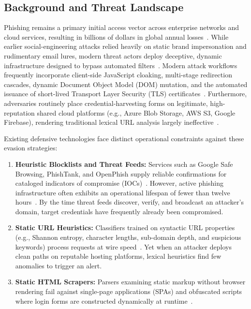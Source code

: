 \documentclass[conference]{IEEEtran}
\begin{document}
\subsection{Background and Threat Landscape}\label{background}

Phishing remains a primary initial access vector across enterprise networks and cloud services, resulting in billions of dollars in global annual losses~\cite{basit2021,zienie2023}. While earlier social-engineering attacks relied heavily on static brand impersonation and rudimentary email lures, modern threat actors deploy deceptive, dynamic infrastructure designed to bypass automated filters~\cite{tang2021}. Modern attack workflows frequently incorporate client-side JavaScript cloaking, multi-stage redirection cascades, dynamic Document Object Model (DOM) mutation, and the automated issuance of short-lived Transport Layer Security (TLS) certificates~\cite{sanchez2022,castano2023}. Furthermore, adversaries routinely place credential-harvesting forms on legitimate, high-reputation shared cloud platforms (e.g., Azure Blob Storage, AWS S3, Google Firebase), rendering traditional lexical URL analysis largely ineffective~\cite{kara2022,reyes2024}.

Existing defensive technologies face distinct operational constraints against these evasion strategies:
\begin{enumerate}[leftmargin=2.5em]
    \item \textbf{Heuristic Blocklists and Threat Feeds:} Services such as Google Safe Browsing, PhishTank, and OpenPhish supply reliable confirmations for cataloged indicators of compromise (IOCs)~\cite{purwanto2022}. However, active phishing infrastructure often exhibits an operational lifespan of fewer than twelve hours~\cite{castano2023}. By the time threat feeds discover, verify, and broadcast an attacker's domain, target credentials have frequently already been compromised.
    \item \textbf{Static URL Heuristics:} Classifiers trained on syntactic URL properties (e.g., Shannon entropy, character lengths, sub-domain depth, and suspicious keywords) process requests at wire speed~\cite{bu2021,zhao2023}. Yet when an attacker deploys clean paths on reputable hosting platforms, lexical heuristics find few anomalies to trigger an alert.
    \item \textbf{Static HTML Scrapers:} Parsers examining static markup without browser rendering fail against single-page applications (SPAs) and obfuscated scripts where login forms are constructed dynamically at runtime~\cite{lin2021,ariyadasa2022}.
\end{enumerate}
\end{document}
